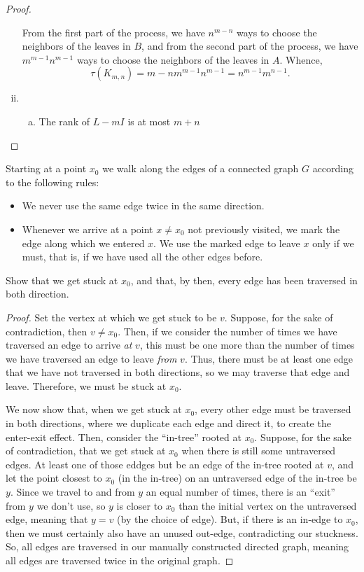 \documentclass[11pt]{article}
\begin{document}
\begin{proof}
\begin{enumerate}[(i)]
        From the first part of the process, we have $n^{m-n}$ ways to choose the neighbors of the leaves in $B$, and from the second part of the process, we have $m^{m-1} n^{m-1}$ ways to choose the neighbors of the leaves in $A$. Whence,
        \[
            \tau(K_{m,n})={m-n}m^{m-1} n^{m-1}=n^{m-1}m^{n-1}.
        \]

        \item \begin{enumerate}[(a)]
            \item The rank of $L - mI$ is at most $m+n$ 
        \end{enumerate}
    \end{enumerate}
\end{proof}
\setcounter{problem}{3}
\begin{quest}
    Starting at a point $x_0$ we walk along the edges of a connected graph $G$ according to the following rules:
    \begin{itemize}
        \item We never use the same edge twice in the same direction.
        \item Whenever we arrive at a point $x\neq x_0$ not previously visited, we mark the edge along which we entered $x$. We use the marked edge to leave $x$ only if we must, that is, if we have used all the other edges before.
    \end{itemize}
    Show that we get stuck at $x_0$, and that, by then, every edge has been traversed in both direction.
\end{quest}
\begin{proof}
    Set the vertex at which we get stuck to be $v$. Suppose, for the sake of contradiction, then $v\neq x_0$. Then, if we consider the number of times we have traversed an edge to arrive \textit{at} $v$, this must be one more than the number of times we have traversed an edge to leave \textit{from} $v$. Thus, there must be at least one edge that we have not traversed in both directions, so we may traverse that edge and leave. Therefore, we must be stuck at $x_0$.

    We now show that, when we get stuck at $x_0$, every other edge must be traversed in both directions, where we duplicate each edge and direct it, to create the enter-exit effect. Then, consider the ``in-tree'' rooted at $x_0$. Suppose, for the sake of contradiction, that we get stuck at $x_0$ when there is still some untraversed edges. At least one of those eddges but be an edge of the in-tree rooted at $v$, and let the point closest to $x_0$ (in the in-tree) on an untraversed edge of the in-tree be $y$. Since we travel to and from $y$ an equal number of times, there is an ``exit'' from $y$ we don't use, so $y$ is closer to $x_0$ than the initial vertex on the untraversed edge, meaning that $y=v$ (by the choice of edge). But, if there is an in-edge to $x_0$, then we must certainly also have an unused out-edge, contradicting our stuckness. So, all edges are traversed in our manually constructed directed graph, meaning all edges are traversed twice in the original graph.
\end{proof}
\end{document}
